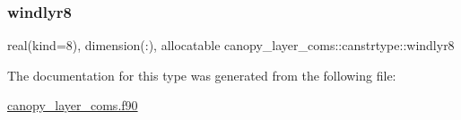 \mbox{\label{structcanopy__layer__coms_1_1canstrtype_ad29af3fcb9a0ed4dc4985eb8f1714283}} 
\subsubsection{\texorpdfstring{windlyr8}{windlyr8}}
{\footnotesize\ttfamily real(kind=8), dimension(\+:), allocatable canopy\+\_\+layer\+\_\+coms\+::canstrtype\+::windlyr8}



The documentation for this type was generated from the following file\+:\begin{DoxyCompactItemize}
\item 
\hyperlink{canopy__layer__coms_8f90}{canopy\+\_\+layer\+\_\+coms.\+f90}\end{DoxyCompactItemize}
